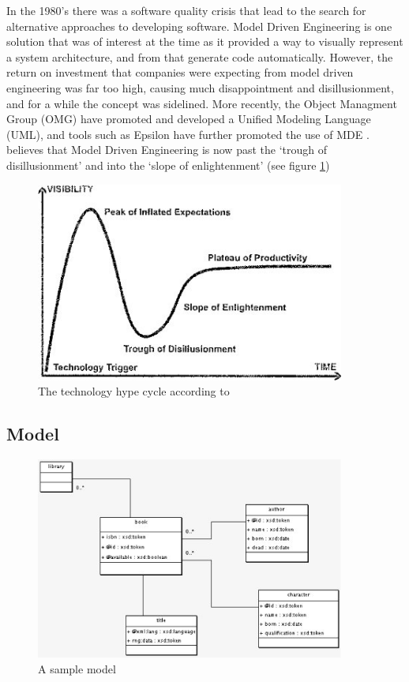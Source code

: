 In the 1980's there was a software quality crisis that lead to the search for alternative approaches to developing software. Model Driven Engineering is one solution that was of interest at the time as it provided a way to visually represent a system architecture, and from that generate code automatically. However, the return on investment that companies were expecting from model driven engineering was far too high, causing much disappointment and disillusionment, and for a while the concept was sidelined. More recently, the Object Managment Group (OMG) have promoted and developed a Unified Modeling Language (UML), and tools such as Epsilon have further promoted the use of MDE \citep{mdeHistory}.  \citet{brambillaBook} believes that Model Driven Engineering is now past the `trough of disillusionment' and into the `slope of enlightenment' (see figure \ref{mde_pos}) \\

\begin{figure}
\begin{center}
	\includegraphics[width=4in]{figures/mde_pos.jpg}
\end{center}
\caption{The technology hype cycle according to \citet{brambillaBook}}
\label{mde_pos}
\end{figure}

\subsection{Model}

\begin{figure}
\begin{center}
	\includegraphics[width=4in]{figures/sample_model.jpg}
\end{center}
\caption{A sample model}
\label{uml_sample}
\end{figure}

